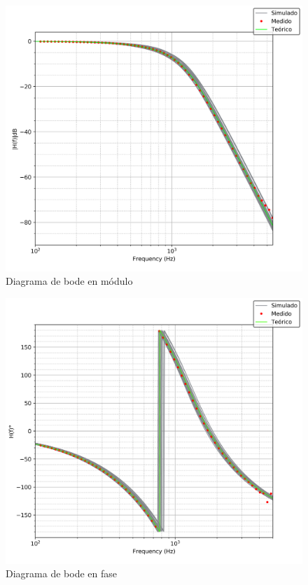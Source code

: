 \begin{figure}[H]
    \centering
    \includegraphics[scale=0.7]{../EJ1/Recursos/bessel_bode_modula.png}
    \caption{Diagrama de bode en m\'odulo}
    \label{fig:bessel_bode_modulo}
\end{figure}

\begin{figure}[H]
    \centering
    \includegraphics[scale=0.7]{../EJ1/Recursos/bessel_bode_fase.png}
    \caption{Diagrama de bode en fase}
    \label{fig:bessel_bode_fase}
\end{figure}


